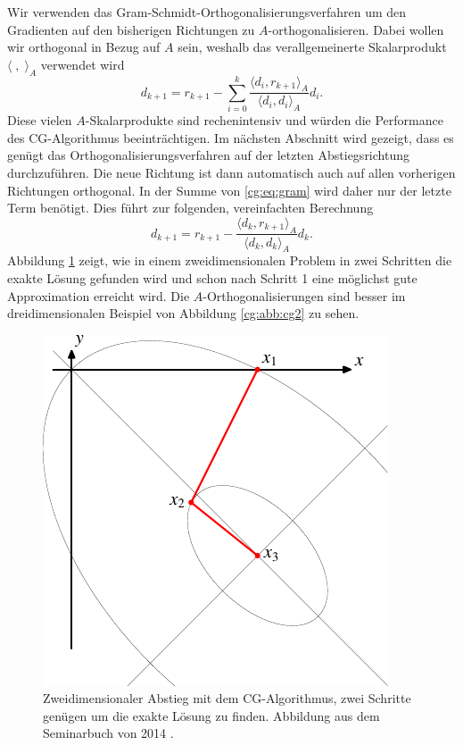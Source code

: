 Wir verwenden das Gram-Schmidt-Orthogonalisierungsverfahren um den Gradienten auf den bisherigen Richtungen zu $A$-orthogonalisieren.
%
Dabei wollen wir orthogonal in Bezug auf $A$ sein, weshalb das verallgemeinerte Skalarprodukt $\langle\; ,\; \rangle_A$ verwendet wird 
\begin{equation}\label{cg:eq:gram}
	d_{k+1} 
	= 
	r_{k+1} - \sum_{i=0}^{k} \frac{\langle d_i , r_{k+1} \rangle_A}{\langle d_i , d_i \rangle_A} d_i.
\end{equation}
Diese vielen $A$-Skalarprodukte sind rechenintensiv und würden die Performance des CG-Algorithmus beeinträchtigen.
Im nächsten Abschnitt wird gezeigt, dass es genügt das Orthogonalisierungsverfahren auf der letzten Abstiegsrichtung durchzuführen.
Die neue Richtung ist dann automatisch auch auf allen vorherigen Richtungen orthogonal.
In der Summe von \eqref{cg:eq:gram} wird daher nur der letzte Term benötigt.
Dies führt zur folgenden, vereinfachten Berechnung
\begin{equation} 
	d_{k+1}
	= 
	r_{k+1} - \frac{\langle d_k , r_{k+1} \rangle_A}{\langle d_k , d_k \rangle_A} d_k.
\end{equation}
Abbildung \ref{cg:abb:cg1} zeigt, wie in einem zweidimensionalen Problem in zwei Schritten die exakte Lösung gefunden wird und schon nach Schritt 1 eine möglichst gute Approximation erreicht wird.
Die $A$-Orthogonalisierungen sind besser im dreidimensionalen Beispiel von Abbildung \ref{cg:abb:cg2} zu sehen.
\begin{figure}	
	\centering
	\includegraphics{papers/cg/images/descent-3}
	\caption{Zweidimensionaler Abstieg mit dem CG-Algorithmus,
		zwei Schritte genügen
		um die exakte Lösung zu finden. 
		Abbildung aus dem Seminarbuch von 2014 \cite{cg:book:hpc}.}
	\label{cg:abb:cg1}
\end{figure}

